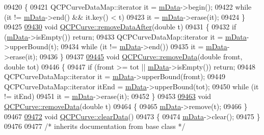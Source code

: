 \begin{DoxyCode}
09420 \{
09421   QCPCurveDataMap::iterator it = \hyperlink{a00028_a88d533e455bca96004b049e99168731b}{mData}->begin();
09422   \textcolor{keywordflow}{while} (it != \hyperlink{a00028_a88d533e455bca96004b049e99168731b}{mData}->end() && it.key() < t)
09423     it = \hyperlink{a00028_a88d533e455bca96004b049e99168731b}{mData}->erase(it);
09424 \}
09425 
\hypertarget{a00115_source_l09430}{}\hyperlink{a00028_a0365cb947c4e6d405ee22e00191d5f52}{09430} \textcolor{keywordtype}{void} \hyperlink{a00028_a0365cb947c4e6d405ee22e00191d5f52}{QCPCurve::removeDataAfter}(\textcolor{keywordtype}{double} t)
09431 \{
09432   \textcolor{keywordflow}{if} (\hyperlink{a00028_a88d533e455bca96004b049e99168731b}{mData}->isEmpty()) \textcolor{keywordflow}{return};
09433   QCPCurveDataMap::iterator it = \hyperlink{a00028_a88d533e455bca96004b049e99168731b}{mData}->upperBound(t);
09434   \textcolor{keywordflow}{while} (it != \hyperlink{a00028_a88d533e455bca96004b049e99168731b}{mData}->end())
09435     it = \hyperlink{a00028_a88d533e455bca96004b049e99168731b}{mData}->erase(it);
09436 \}
09437 
\hypertarget{a00115_source_l09445}{}\hyperlink{a00028_ad45bb5479be799163028ef2b776f7221}{09445} \textcolor{keywordtype}{void} \hyperlink{a00028_ad45bb5479be799163028ef2b776f7221}{QCPCurve::removeData}(\textcolor{keywordtype}{double} fromt, \textcolor{keywordtype}{double} tot)
09446 \{
09447   \textcolor{keywordflow}{if} (fromt >= tot || \hyperlink{a00028_a88d533e455bca96004b049e99168731b}{mData}->isEmpty()) \textcolor{keywordflow}{return};
09448   QCPCurveDataMap::iterator it = \hyperlink{a00028_a88d533e455bca96004b049e99168731b}{mData}->upperBound(fromt);
09449   QCPCurveDataMap::iterator itEnd = \hyperlink{a00028_a88d533e455bca96004b049e99168731b}{mData}->upperBound(tot);
09450   \textcolor{keywordflow}{while} (it != itEnd)
09451     it = \hyperlink{a00028_a88d533e455bca96004b049e99168731b}{mData}->erase(it);
09452 \}
09453 
\hypertarget{a00115_source_l09463}{}\hyperlink{a00028_a30c91acfa591ec534c49fed4c0fca39a}{09463} \textcolor{keywordtype}{void} \hyperlink{a00028_ad45bb5479be799163028ef2b776f7221}{QCPCurve::removeData}(\textcolor{keywordtype}{double} t)
09464 \{
09465   \hyperlink{a00028_a88d533e455bca96004b049e99168731b}{mData}->remove(t);
09466 \}
09467 
\hypertarget{a00115_source_l09472}{}\hyperlink{a00028_ae0462c61dbfbac07db0736ec64110241}{09472} \textcolor{keywordtype}{void} \hyperlink{a00028_ae0462c61dbfbac07db0736ec64110241}{QCPCurve::clearData}()
09473 \{
09474   \hyperlink{a00028_a88d533e455bca96004b049e99168731b}{mData}->clear();
09475 \}
09476 
09477 \textcolor{comment}{/* inherits documentation from base class */}

\end{DoxyCode}
